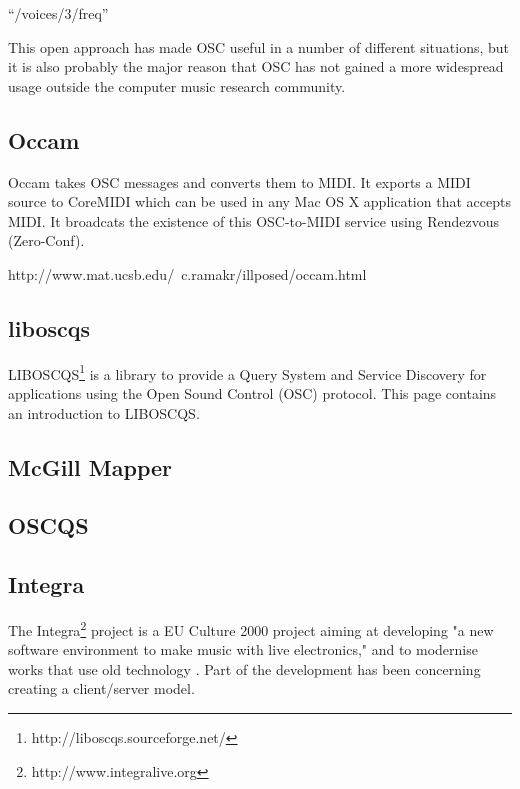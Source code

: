 \documentclass{sig-alternate}
\begin{document}
“/voices/3/freq” 

This open approach has made OSC useful in a number of different situations, but it is also probably the major reason that OSC has not gained a more widespread usage outside the computer music research community. 

\subsection{Occam}


Occam takes OSC messages and converts them to MIDI. It exports a MIDI source to CoreMIDI which can be used in any Mac OS X application that accepts MIDI. It broadcats the existence of this OSC-to-MIDI service using Rendezvous (Zero-Conf).

http://www.mat.ucsb.edu/~c.ramakr/illposed/occam.html


\subsection{liboscqs}

LIBOSCQS\footnote{http://liboscqs.sourceforge.net/} is a library to provide a Query System and Service Discovery for applications using the Open Sound Control (OSC) protocol. This page contains an introduction to LIBOSCQS.


\subsection{McGill Mapper}

\cite{Malloch:2007}


\subsection{OSCQS}

\cite{Habets:2005}

\subsection{Integra}

The Integra\footnote{http://www.integralive.org} project is a EU Culture 2000 project aiming at developing "a new software environment to make music with live electronics," and to modernise works that use old technology \cite{Bullock:2007}. Part of the development has been concerning creating a client/server model. 
\end{document}
